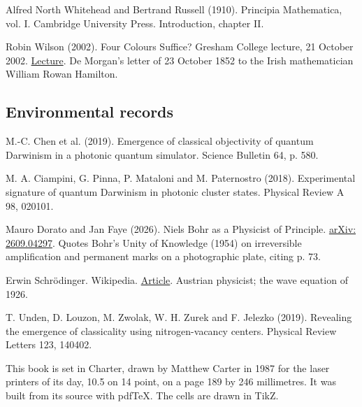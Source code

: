 \documentclass[11pt,twoside]{article}
\theoremstyle{thielethm}
\theoremstyle{thieledef}
\theoremstyle{thieledef}
\theoremstyle{thieledef}
\theoremstyle{thielethm}
\theoremstyle{thieleobs}
\theoremstyle{thielethm}
\begin{document}
\noindent Alfred North Whitehead and Bertrand Russell (1910). Principia Mathematica, vol. I. Cambridge University Press. Introduction, chapter II.
\par\medskip

\noindent Robin Wilson (2002). Four Colours Suffice? Gresham College lecture, 21 October 2002. \href{https://www.gresham.ac.uk/node/11353}{Lecture}. De Morgan's letter of 23 October 1852 to the Irish mathematician William Rowan Hamilton.
\par\medskip

\subsection{Environmental records}



\noindent M.-C. Chen et al. (2019). Emergence of classical objectivity of quantum Darwinism in a photonic quantum simulator. Science Bulletin 64, p. 580.
\par\medskip

\noindent M. A. Ciampini, G. Pinna, P. Mataloni and M. Paternostro (2018). Experimental signature of quantum Darwinism in photonic cluster states. Physical Review A 98, 020101.
\par\medskip

\noindent Mauro Dorato and Jan Faye (2026). Niels Bohr as a Physicist of Principle. \href{https://arxiv.org/abs/2609.04297}{arXiv: 2609.04297}. Quotes Bohr's Unity of Knowledge (1954) on irreversible amplification and permanent marks on a photographic plate, citing p. 73.
\par\medskip

\noindent Erwin Schrödinger. Wikipedia. \href{https://en.wikipedia.org/wiki/Erwin_Schr\%C3\%B6dinger}{Article}. Austrian physicist; the wave equation of 1926.
\par\medskip

\noindent T. Unden, D. Louzon, M. Zwolak, W. H. Zurek and F. Jelezko (2019). Revealing the emergence of classicality using nitrogen-vacancy centers. Physical Review Letters 123, 140402.
\par\medskip

\cleardoublepage
\thispagestyle{empty}
\vspace*{154pt}
\begingroup\setlength{\parindent}{0pt}\setlength{\parskip}{7pt}
\noindent{}

\vspace{14pt}
This book is set in Charter, drawn by Matthew Carter in 1987 for the laser printers of its day,
10.5 on 14 point, on a page 189 by 246 millimetres. It was built from its source with pdfTeX.
The cells are drawn in TikZ.
\end{document}
